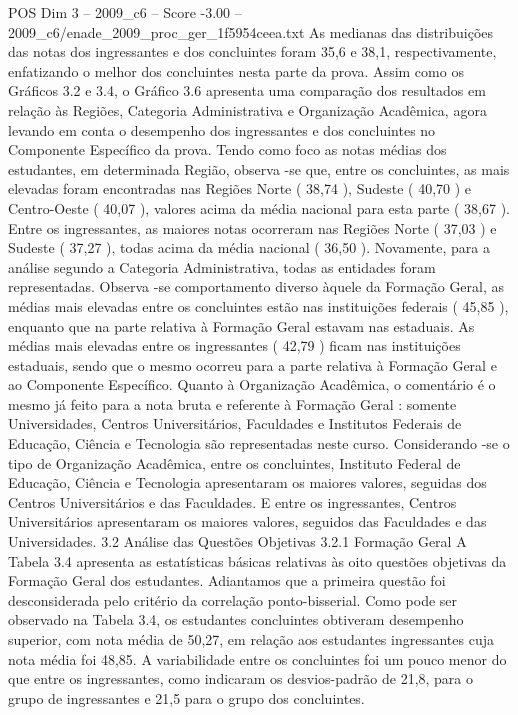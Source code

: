 \begin{textsample}{POS Dim 3 – 2009\_c6 – Score -3.00 – 2009\_c6/enade\_2009\_proc\_ger\_1f5954ceea.txt}
As medianas das distribuições das notas dos ingressantes e dos concluintes foram 35,6 e 38,1, respectivamente, enfatizando o melhor dos concluintes nesta parte da prova.
Assim como os Gráficos 3.2 e 3.4, o Gráfico 3.6 apresenta uma comparação dos resultados em relação às Regiões, Categoria Administrativa e Organização Acadêmica, agora levando em conta o desempenho dos ingressantes e dos concluintes no Componente Específico da prova.
Tendo como foco as notas médias dos estudantes, em determinada Região, observa -se que, entre os concluintes, as mais elevadas foram encontradas nas Regiões Norte ( 38,74 ), Sudeste ( 40,70 ) e Centro-Oeste ( 40,07 ), valores acima da média nacional para esta parte ( 38,67 ).
Entre os ingressantes, as maiores notas ocorreram nas Regiões Norte ( 37,03 ) e Sudeste ( 37,27 ), todas acima da média nacional ( 36,50 ).
Novamente, para a análise segundo a Categoria Administrativa, todas as entidades foram representadas.
Observa -se comportamento diverso àquele da Formação Geral, as médias mais elevadas entre os concluintes estão nas instituições federais ( 45,85 ), enquanto que na parte relativa à Formação Geral estavam nas estaduais.
As médias mais elevadas entre os ingressantes ( 42,79 ) ficam nas instituições estaduais, sendo que o mesmo ocorreu para a parte relativa à Formação Geral e ao Componente Específico.
Quanto à Organização Acadêmica, o comentário é o mesmo já feito para a nota bruta e referente à Formação Geral : somente Universidades, Centros Universitários, Faculdades e Institutos Federais de Educação, Ciência e Tecnologia são representadas neste curso.
Considerando -se o tipo de Organização Acadêmica, entre os concluintes, Instituto Federal de Educação, Ciência e Tecnologia apresentaram os maiores valores, seguidas dos Centros Universitários e das Faculdades.
E entre os ingressantes, Centros Universitários apresentaram os maiores valores, seguidos das Faculdades e das Universidades. 3.2 Análise das Questões Objetivas 3.2.1 Formação Geral A Tabela 3.4 apresenta as estatísticas básicas relativas às oito questões objetivas da Formação Geral dos estudantes.
Adiantamos que a primeira questão foi desconsiderada pelo critério da correlação ponto-bisserial.
Como pode ser observado na Tabela 3.4, os estudantes concluintes obtiveram desempenho superior, com nota média de 50,27, em relação aos estudantes ingressantes cuja nota média foi 48,85.
A variabilidade entre os concluintes foi um pouco menor do que entre os ingressantes, como indicaram os desvios-padrão de 21,8, para o grupo de ingressantes e 21,5 para o grupo dos concluintes.

\end{textsample}
